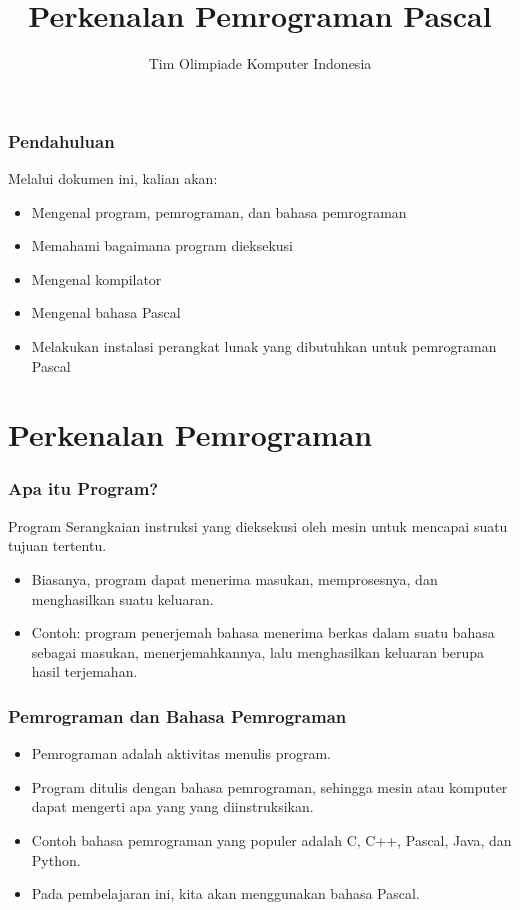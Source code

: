 

\title{Perkenalan Pemrograman Pascal}
\author{Tim Olimpiade Komputer Indonesia}
\date{}



\begin{frame}
\titlepage
\end{frame}

\begin{frame}
\frametitle{Pendahuluan}
Melalui dokumen ini, kalian akan:
\begin{itemize}
  \item Mengenal program, pemrograman, dan bahasa pemrograman
  \item Memahami bagaimana program dieksekusi
  \item Mengenal kompilator
  \item Mengenal bahasa Pascal
  \item Melakukan instalasi perangkat lunak yang dibutuhkan untuk pemrograman Pascal
\end{itemize}
\end{frame}

\section{Perkenalan Pemrograman}
\frame{\sectionpage}

\begin{frame}
\frametitle{Apa itu Program?}
\begin{block}{Program}
  Serangkaian instruksi yang dieksekusi oleh mesin untuk mencapai suatu tujuan tertentu.
\end{block}
\begin{itemize}
  \item Biasanya, program dapat menerima masukan, memprosesnya, dan menghasilkan suatu keluaran.
  \item Contoh: program penerjemah bahasa menerima berkas dalam suatu bahasa sebagai masukan, menerjemahkannya, lalu menghasilkan keluaran berupa hasil terjemahan.
\end{itemize}
\end{frame}

\begin{frame}
\frametitle{Pemrograman dan Bahasa Pemrograman}
\begin{itemize}
  \item Pemrograman adalah aktivitas menulis program.
  \item Program ditulis dengan bahasa pemrograman, sehingga mesin atau komputer dapat mengerti apa yang yang diinstruksikan.
  \item Contoh bahasa pemrograman yang populer adalah C, C++, Pascal, Java, dan Python.
  \item Pada pembelajaran ini, kita akan menggunakan bahasa Pascal.
\end{itemize}
\end{frame}

